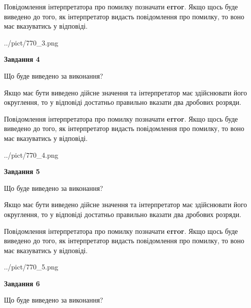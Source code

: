 \documentclass[12pt, ukrainian]{article}
\begin{document}
{\begin {Large}
Повідомлення інтерпретатора про помилку позначати \textbf{error}.
Якщо щось буде виведено до того, як інтерпретатор видасть повідомлення про помилку, 
то воно має вказуватись у відповіді. \par

\begin{center}
	{../pict/770_3.png}
\end{center}
\newpage

{\begin {center}\textbf{Завдання 4}\end {center}}\par
Що буде виведено за виконання? \par

Якщо має бути виведено дійсне значення та інтерпретатор має здійснювати його округлення, 
то у відповіді достатньо правильно вказати два дробових розряди.

Повідомлення інтерпретатора про помилку позначати \textbf{error}.
Якщо щось буде виведено до того, як інтерпретатор видасть повідомлення про помилку, 
то воно має вказуватись у відповіді. \par

\begin{center}
	{../pict/770_4.png}
\end{center}
\newpage

{\begin {center}\textbf{Завдання 5}\end {center}}\par
Що буде виведено за виконання? \par

Якщо має бути виведено дійсне значення та інтерпретатор має здійснювати його округлення, 
то у відповіді достатньо правильно вказати два дробових розряди.

Повідомлення інтерпретатора про помилку позначати \textbf{error}.
Якщо щось буде виведено до того, як інтерпретатор видасть повідомлення про помилку, 
то воно має вказуватись у відповіді. \par

\begin{center}
	{../pict/770_5.png}
\end{center}
\newpage

{\begin {center}\textbf{Завдання 6}\end {center}}\par
Що буде виведено за виконання? \par


\end{Large}}
\end{document}
